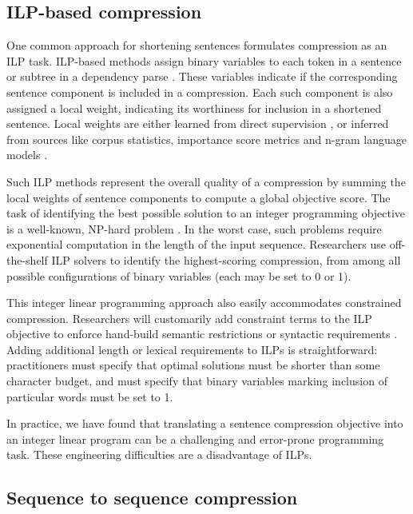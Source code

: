 \documentclass[11pt,a4paper]{article}
\begin{document}
\subsection{ILP-based compression}\label{s:ilps}

One common approach for shortening sentences formulates compression as an ILP task. ILP-based methods assign binary variables to each token in a sentence \cite{clarke2008global} or subtree in a dependency parse \cite{filippova2008dependency}. These variables indicate if the corresponding sentence component is included in a compression. Each such component is also assigned a local weight, indicating its worthiness for inclusion in a shortened sentence. Local weights are either learned from direct supervision \cite{filippova2013overcoming,Wang2017CanSH}, or inferred from sources like corpus statistics, importance score metrics and n-gram language models \cite{clarke2008global,filippova2008dependency}.

Such ILP methods represent the overall quality of a compression by summing the local weights of sentence components to compute a global objective score.  The task of identifying the best possible solution to an integer programming objective is a well-known, NP-hard problem \cite{clarke2008global}. In the worst case, such problems require exponential computation in the length of the input sequence. Researchers use off-the-shelf ILP solvers to identify the highest-scoring compression, from among all possible configurations of binary variables (each may be set to 0 or 1). 

This integer linear programming approach also easily accommodates constrained compression. Researchers will customarily add constraint terms to the ILP objective to enforce hand-build semantic restrictions \cite{clarke2008global} or syntactic requirements \cite{filippova2008dependency}. Adding additional length or lexical requirements to ILPs is straightforward: practitioners must specify that optimal solutions must be shorter than some character budget, and must specify that binary variables marking inclusion of particular words must be set to 1. 

In practice, we have found that translating a sentence compression objective into an integer linear program can be a challenging and error-prone programming task. These engineering difficulties are a disadvantage of ILPs.

\subsection{Sequence to sequence compression}
\end{document}
